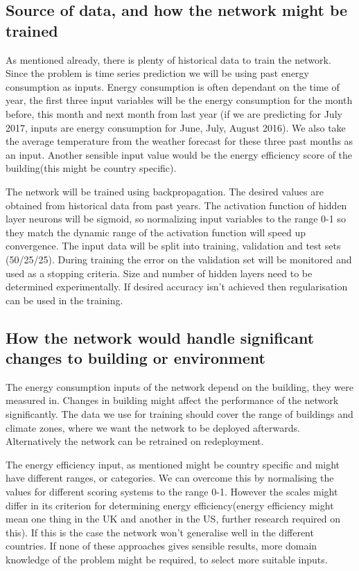 \documentclass[a4paper, 11pt]{article}
\begin{document}
\subsection{Source of data, and how the network might be trained}
As mentioned already, there is plenty of historical data to train the network. Since the problem is time series prediction we will be using past energy consumption as inputs. Energy consumption is often dependant on the time of year, the first three input variables will be the energy consumption for the month before, this month and next month from last year (if we are predicting for July 2017, inputs are energy consumption for June, July, August 2016). We also take the average temperature from the weather forecast for these three past months as an input. Another sensible input value would be the energy efficiency score of the building(this might be country specific).

The network will be trained using backpropagation. The desired values are obtained from historical data from past years. The activation function of hidden layer neurons will be sigmoid, so normalizing input variables to the range 0-1 so they match the dynamic range of the activation function will speed up convergence. The input data will be split into training, validation and test sets (50/25/25). During training the error on the validation set will be monitored and used as a stopping criteria. Size and number of hidden layers need to be determined experimentally. If desired accuracy isn't achieved then regularisation can be used in the training. 
\subsection{How the network would handle significant changes to building or environment}
The energy consumption inputs of the network depend on the building, they were measured in. Changes in building might affect the performance of the network significantly. The data we use for training should cover the range of buildings and climate zones, where we want the network to be deployed afterwards. Alternatively the network can be retrained on redeployment. 

The energy efficiency input, as mentioned might be country specific and might have different ranges, or categories. We can overcome this by normalising the values for different scoring systems to the range 0-1. However the scales might differ in its criterion for determining energy efficiency(energy efficiency might mean one thing in the UK and another in the US, further research required on this). If this is the case the network won't generalise well in the different countries. If none of these approaches gives sensible results, more domain knowledge of the problem might be required, to select more suitable inputs. 
\end{document}
